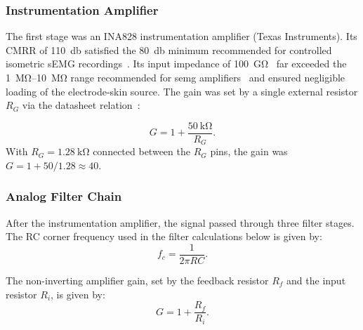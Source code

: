 \subsubsection{Instrumentation Amplifier}
\label{sec:ina828}
The first stage was an INA828 instrumentation amplifier (Texas Instruments). Its CMRR of \SI{110}{\decibel} satisfied the \SI{80}{\decibel} minimum recommended for controlled isometric sEMG recordings~\cite{kamen_essentials_2010}. Its input impedance of \SI{100}{\giga\ohm}~\cite{noauthor_ina828_nodate} far exceeded the \SIrange{1}{10}{\mega\ohm} range recommended for \gls{semg} amplifiers~\cite{konrad_abc_2006} and ensured negligible loading of the electrode-skin source. The gain was set by a single external resistor $R_G$ via the datasheet relation~\cite{noauthor_ina828_nodate}:

\begin{equation}
    G = 1 + \frac{\SI{50}{\kilo\ohm}}{R_G}.
    \label{eq:ina828-gain}
\end{equation}
With $R_G = \SI{1.28}{\kilo\ohm}$ connected between the $R_G$ pins, the gain was $G = 1 + 50/1.28 \approx \num{40}$.

\subsubsection{Analog Filter Chain}
After the instrumentation amplifier, the signal passed through three filter stages. The RC corner frequency used in the filter calculations below is given by:
\begin{equation}
    f_c = \frac{1}{2\pi RC}.
    \label{eq:RC_fc}
\end{equation}

The non-inverting amplifier gain, set by the feedback resistor $R_f$ and the input resistor $R_i$, is given by:
\begin{equation}
    G = 1 + \frac{R_f}{R_i}.
    \label{eq:noninv_gain}
\end{equation}

